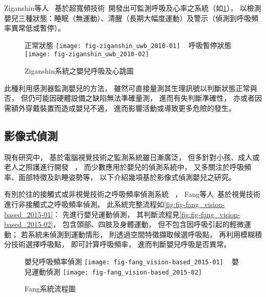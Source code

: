 \documentclass[class=NCU_thesis, crop=false]{standalone}
\begin{document}
Ziganshin等人~\cite{ziganshin_uwb_2010}
基於超寬頻技術~\cite{staderini_uwb_2002}開發出可監測呼吸及心率之系統（如\cref{fig:fig-ziganshin_uwb_2010}），
以檢測嬰兒三種狀態：睡眠（無運動）、清醒（長期大幅度運動）及警示（偵測到呼吸頻率異常低或暫停）。
\begin{figure}[!hbt]
    \centering
    \subcaptionbox
        {正常狀態
        \label{fig:fig-ziganshin_uwb_2010-01}}
        {\texttt{[image: fig-ziganshin\_uwb\_2010-01]}}
    ~
    \subcaptionbox
        {呼吸暫停狀態
        \label{fig:fig-ziganshin_uwb_2010-02}}
        {\texttt{[image: fig-ziganshin\_uwb\_2010-02]}}
    \caption{Ziganshin系統之嬰兒呼吸及心跳圖~\cite{ziganshin_uwb_2010}}
    \label{fig:fig-ziganshin_uwb_2010}
\end{figure}

此種利用感測器監測嬰兒的方法，
雖然可直接量測其生理訊號以判斷狀態正常與否，
但仍可能因硬體設備之缺陷無法準確量測，
進而有失判斷準確性，
亦或者因需額外穿戴裝置而造成嬰兒不適，
進而影響活動或導致更多危險的發生。

\subsection{影像式偵測}
現有研究中，
基於電腦視覺技術之監測系統雖日漸廣泛，
但多針對小孩、成人或老人之照護進行開發
~\cite{kuo_visual_2010, yiping_detection_2006, rudovic_culturenet_2018, liu_deep_2015}，
而少數應用於嬰兒的偵測系統中，
又多關注於呼吸頻率、面部特徵及趴睡姿勢等，
以下介紹幾項基於影像式偵測嬰兒之研究。

有別於往的接觸式或非視覺技術之呼吸頻率偵測系統
~\cite{mack_development_2009, berset_robust_2012, cao_non-invasive_2007, scalise_measurement_2011}，
Fang等人~\cite{fang_vision-based_2015}基於視覺技術進行非接觸式之呼吸頻率偵測。
此系統完整流程如\cref{fig:fig-fang_vision-based_2015-01}：
先進行嬰兒運動偵測，
其判斷流程見\cref{fig:fig-fang_vision-based_2015-02}，
包含頭部、四肢及身體運動，
但不包含因呼吸引起的輕微運動；
若系統未偵測到運動情形，
則透過空間特徵擷取候選呼吸點，
再利用模糊積分技術選擇呼吸點，
即可計算呼吸頻率，
進而判斷嬰兒呼吸是否異常。
\begin{figure}[!hbt]
    \centering
    \subcaptionbox
        {嬰兒呼吸頻率偵測
        \label{fig:fig-fang_vision-based_2015-01}}
        {\texttt{[image: fig-fang\_vision-based\_2015-01]}}
    ~
    \subcaptionbox
        {嬰兒運動偵測
        \label{fig:fig-fang_vision-based_2015-02}}
        {\texttt{[image: fig-fang\_vision-based\_2015-02]}}
    \caption{Fang系統流程圖~\cite{fang_vision-based_2015}}
    \label{fig:fig-fang_vision-based_2015}
\end{figure}
\end{document}
